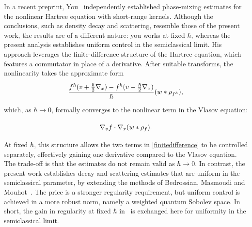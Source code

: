 In a recent preprint, You~\cite{You2024} independently established phase-mixing estimates for the nonlinear Hartree equation with short-range kernels. Although the conclusions, such as density decay and scattering, resemble those of the present work, the results are of a different nature: you works at fixed $\hbar$, whereas the present analysis establishes uniform control in the semiclassical limit. His approach leverages the finite-difference structure of the Hartree equation, which features a commutator in place of a derivative. After suitable transforms, the nonlinearity takes the approximate form
\begin{align}\label{finitedifference}
\frac{f^\hbar(v+\frac{\hbar}{2}\nabla_x)-f^\hbar(v-\frac{\hbar}{2}\nabla_x)}{\hbar}(w*\rho_{f^\hbar}),\vphantom{\int^{A^A}_{B_B}}
\end{align}
which, as $\hbar\to0$, formally converges to the nonlinear term in the Vlasov equation:
\begin{align*}
\nabla_vf\cdot\nabla_x(w*\rho_f).\vphantom{\int^A_B}
\end{align*}
At fixed $\hbar$, this structure allows the two terms in \eqref{finitedifference} to be controlled separately, effectively gaining one derivative compared to the Vlasov equation. The trade-off is that the estimates do not remain valid as $\hbar\to0$. In contrast, the present work establishes decay and scattering estimates that are uniform in the semiclassical parameter, by extending the methods of Bedrossian, Masmoudi and Mouhot~\cite{BedrossianMasmoudiMouhot2018}. The price is a stronger regularity requirement, but uniform control is achieved in a more robust norm, namely a weighted quantum Sobolev space. In short, the gain in regularity at fixed $\hbar$ in~\cite{You2024} is exchanged here for uniformity in the semiclassical limit.

